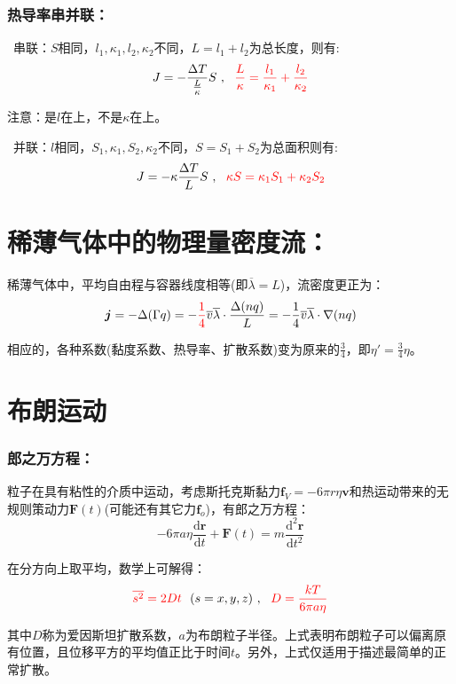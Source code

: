 \documentclass[zihao=5,UTF8]{report}
\begin{document}
\subsubsection{热导率串并联：}
\ 串联：$S$相同，$l_1,\kappa_1,l_2,\kappa_2$不同，$L=l_1+l_2$为总长度，则有:
\begin{equation}
    J = -\frac{\Delta T}{\frac{L}{\kappa}}S\ ,\ \ {\color{red}\frac{L}{\kappa} = \frac{l_1}{\kappa_1} +\frac{l_2}{\kappa_2}}
\end{equation}\par
{\par\color{gray}\small
注意：是$l$在上，不是$\kappa$在上。
\par}

\ 并联：$l$相同，$S_1,\kappa_1,S_2,\kappa_2$不同，$S=S_1+S_2$为总面积则有:
\begin{equation}
    J = -\kappa\frac{\Delta T}{L}S\ ,\ \ {\color{red}\kappa S = \kappa_1 S_1 +\kappa_2 S_2}
\end{equation}
\section{稀薄气体中的物理量密度流：}
稀薄气体中，平均自由程与容器线度相等(即$\overline{\lambda} = L$)，流密度更正为：
\begin{equation}
    \boldsymbol{j} = -\Delta (\Gamma q) =  - \textcolor{red}{\frac{1}{4} } \overline{v}\overline{\lambda} \cdot \frac{\Delta (nq)}{L} = - \frac{1}{4} \overline{v}\overline{\lambda} \cdot \nabla(nq)
\end{equation}\par
相应的，各种系数(黏度系数、热导率、扩散系数)变为原来的$\frac{3}{4}$，即$\eta' = \frac{3}{4}\eta$。
\section{布朗运动}
\subsubsection{郎之万方程：}
粒子在具有粘性的介质中运动，考虑斯托克斯黏力$\boldsymbol{f}_V = -6\pi r\eta\boldsymbol{v}$和热运动带来的无规则策动力$\boldsymbol{F}(t)$(可能还有其它力$\boldsymbol{f}_o$)，有郎之万方程：
\begin{equation}
    -6\pi a\eta\frac{\mathrm{d}\boldsymbol{r}}{\mathrm{d}t } + \boldsymbol{F}(t) = m\frac{\mathrm{d}^2\boldsymbol{r}}{\mathrm{d}t^2}
\end{equation}\par 
在分方向上取平均，数学上可解得：
\begin{equation}
    \textcolor{red}{\overline{s^2}  = 2Dt}\ \ (s = x,y,z)\ ,\ \  \textcolor{red}{D = \frac{kT}{6\pi a \eta }}
\end{equation}\par
{\color{gray}\small 其中$D$称为爱因斯坦扩散系数，$a$为布朗粒子半径。上式表明布朗粒子可以偏离原有位置，且位移平方的平均值正比于时间$t$。另外，上式仅适用于描述最简单的正常扩散。} 
\end{document}
